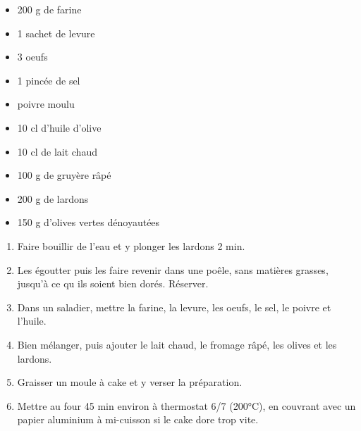 \bigskip
{}
{}{\begin{itemize}
	\item 200 g de farine
	\item 1 sachet de levure
	\item 3 oeufs
	\item 1 pincée de sel
	\item poivre moulu
	\item 10 cl d'huile d'olive
	\item 10 cl de lait chaud
	\item 100 g de gruyère râpé
	\item 200 g de lardons
	\item 150 g d'olives vertes dénoyautées
\end{itemize}}
{\begin{enumerate}
	\item Faire bouillir de l'eau et y plonger les lardons 2 min.
	\item Les égoutter puis les faire revenir dans une poêle, sans matières grasses, jusqu'à ce qu ils soient bien dorés. Réserver.
	\item Dans un saladier, mettre la farine, la levure, les oeufs, le sel, le poivre et l'huile.
	\item Bien mélanger, puis ajouter le lait chaud, le fromage râpé, les olives et les lardons.
	\item Graisser un moule à cake et y verser la préparation.
	\item Mettre au four 45 min environ à thermostat 6/7 (200°C), en couvrant avec un papier aluminium à mi-cuisson si le cake dore trop vite.
\end{enumerate}}

